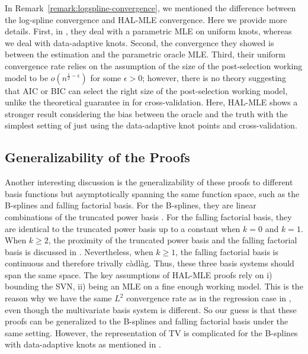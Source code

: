 In Remark~\ref{remark:logspline-convergence}, we mentioned the difference between the log-spline convergence and HAL-MLE convergence. Here we provide more details. First, in \citet{stone1990large}, they deal with a parametric MLE on uniform knots, whereas we deal with data-adaptive knots. Second, the convergence they showed is between the estimation and the parametric oracle MLE. Third, their uniform convergence rate relies on the assumption of the size of the post-selection working model to be $o(n^{\frac12 - \epsilon})$ for some $\epsilon > 0$; however, there is no theory suggesting that AIC or BIC can select the right size of the post-selection working model, unlike the theoretical guarantee in \citet{van2003unified} for cross-validation. Here, HAL-MLE shows a stronger result considering the bias between the oracle and the truth with the simplest setting of just using the data-adaptive knot points and cross-validation.

\subsection{Generalizability of the Proofs} 
\label{subsect: Generalizability of the Proofs}
Another interesting discussion is the generalizability of these proofs to different basis functions but asymptotically spanning the same function space, such as the B-splines and falling factorial basis. For the B-splines, they are linear combinations of the truncated power basis \citep{de1976splines}. For the falling factorial basis, they are identical to the truncated power basis up to a constant when $k=0$ and $k=1$. When $k \geq 2$, the proximity of the truncated power basis and the falling factorial basis is discussed in \citet[Chapter 10.1]{tibshirani2022divided}. Nevertheless, when $k \geq 1$, the falling factorial basis is continuous and therefore trivally càdlàg. Thus, these three basis systems should span the same space. The key assumptions of HAL-MLE proofs rely on i) bounding the SVN, ii) being an MLE on a fine enough working model. This is the reason why we have the same $L^2$ convergence rate as in the regression case in \citet{fang2021multivariate, ki2024mars}, even though the multivariate basis system is different. So our guess is that these proofs can be generalized to the B-splines and falling factorial basis under the same setting. However, the representation of TV is complicated for the B-splines with data-adaptive knots as mentioned in \citet[Section 3]{wang2014falling}.

